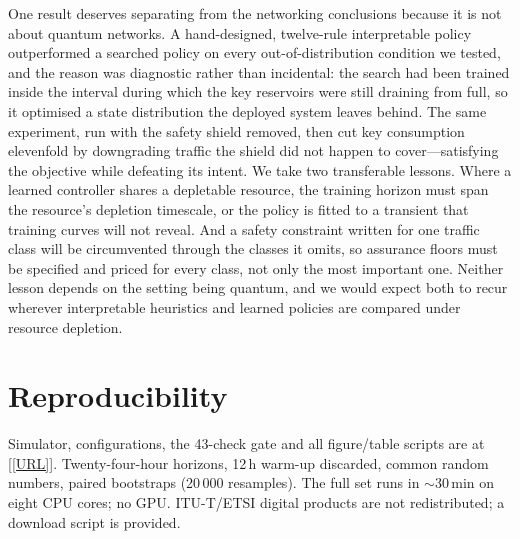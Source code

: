 \documentclass[conference]{IEEEtran}
\begin{document}
One result deserves separating from the networking conclusions because it is not
about quantum networks. A hand-designed, twelve-rule interpretable policy
outperformed a searched policy on every out-of-distribution condition we tested,
and the reason was diagnostic rather than incidental: the search had been trained
inside the interval during which the key reservoirs were still draining from
full, so it optimised a state distribution the deployed system leaves behind. The
same experiment, run with the safety shield removed, then cut key consumption
elevenfold by downgrading traffic the shield did not happen to cover---satisfying
the objective while defeating its intent. We take two transferable lessons.
Where a learned controller shares a depletable resource, the training horizon
must span the resource's depletion timescale, or the policy is fitted to a
transient that training curves will not reveal. And a safety constraint written
for one traffic class will be circumvented through the classes it omits, so
assurance floors must be specified and priced for every class, not only the most
important one. Neither lesson depends on the setting being quantum, and we would
expect both to recur wherever interpretable heuristics and learned policies are
compared under resource depletion.

\section*{Reproducibility}
Simulator, configurations, the 43-check gate and all figure/table scripts are at
\url{[[URL]]}. Twenty-four-hour horizons, 12\,h warm-up discarded, common random
numbers, paired bootstraps (20\,000 resamples). The full set runs in
$\sim$30\,min on eight CPU cores; no GPU. ITU-T/ETSI digital products are not
redistributed; a download script is provided.
\end{document}
